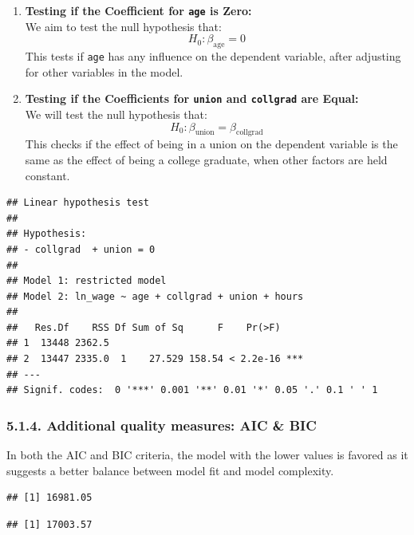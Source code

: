 \documentclass[
]{article}
\begin{document}
\begin{enumerate}
\def\labelenumi{\arabic{enumi}.}
\item
  \textbf{Testing if the Coefficient for \texttt{age} is Zero:}\\
  We aim to test the null hypothesis that: \begin{equation}
  H_0: \beta_{\text{age}} = 0
  \end{equation} This tests if \texttt{age} has any influence on the
  dependent variable, after adjusting for other variables in the model.
\item
  \textbf{Testing if the Coefficients for \texttt{union} and
  \texttt{collgrad} are Equal:}\\
  We will test the null hypothesis that: \begin{equation}
  H_0: \beta_{\text{union}} = \beta_{\text{collgrad}}
  \end{equation} This checks if the effect of being in a union on the
  dependent variable is the same as the effect of being a college
  graduate, when other factors are held constant.
\end{enumerate}

\begin{verbatim}
## Linear hypothesis test
## 
## Hypothesis:
## - collgrad  + union = 0
## 
## Model 1: restricted model
## Model 2: ln_wage ~ age + collgrad + union + hours
## 
##   Res.Df    RSS Df Sum of Sq      F    Pr(>F)    
## 1  13448 2362.5                                  
## 2  13447 2335.0  1    27.529 158.54 < 2.2e-16 ***
## ---
## Signif. codes:  0 '***' 0.001 '**' 0.01 '*' 0.05 '.' 0.1 ' ' 1
\end{verbatim}

\hypertarget{additional-quality-measures-aic-bic}{%
\subsubsection{5.1.4. Additional quality measures: AIC \&
BIC}\label{additional-quality-measures-aic-bic}}

In both the AIC and BIC criteria, the model with the lower values is
favored as it suggests a better balance between model fit and model
complexity.

\begin{verbatim}
## [1] 16981.05
\end{verbatim}

\begin{verbatim}
## [1] 17003.57
\end{verbatim}
\end{document}
